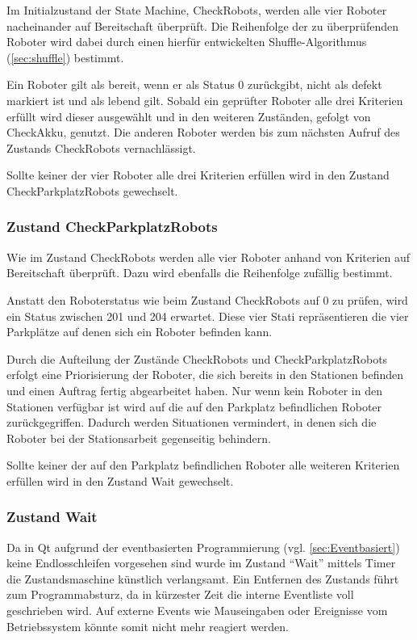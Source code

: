 Im Initialzustand der State Machine, CheckRobots, werden alle vier Roboter nacheinander auf Bereitschaft überprüft. Die Reihenfolge der zu überprüfenden Roboter wird dabei durch einen hierfür entwickelten Shuffle-Algorithmus (\ref{sec:shuffle}) bestimmt. 

Ein Roboter gilt als bereit, wenn er als Status 0 zurückgibt, nicht als defekt markiert ist und als lebend gilt. Sobald ein geprüfter Roboter alle drei Kriterien erfüllt wird dieser ausgewählt und in den weiteren Zuständen, gefolgt von CheckAkku, genutzt. Die anderen Roboter werden bis zum nächsten Aufruf des Zustands CheckRobots vernachlässigt.

Sollte keiner der vier Roboter alle drei Kriterien erfüllen wird in den Zustand CheckParkplatzRobots gewechselt.

\subsubsection{Zustand CheckParkplatzRobots}

Wie im Zustand CheckRobots werden alle vier Roboter anhand von Kriterien auf Bereitschaft überprüft. Dazu wird ebenfalls die Reihenfolge zufällig bestimmt.

Anstatt den Roboterstatus wie beim Zustand CheckRobots auf 0 zu prüfen, wird ein Status zwischen 201 und 204 erwartet. Diese vier Stati repräsentieren die vier Parkplätze auf denen sich ein Roboter befinden kann. 

Durch die Aufteilung der Zustände CheckRobots und CheckParkplatzRobots erfolgt eine Priorisierung der Roboter, die sich bereits in den Stationen befinden und einen Auftrag fertig abgearbeitet haben. Nur wenn kein Roboter in den Stationen verfügbar ist wird auf die auf den Parkplatz befindlichen Roboter zurückgegriffen. Dadurch werden Situationen vermindert, in denen sich die Roboter bei der Stationsarbeit gegenseitig behindern.

Sollte keiner der auf den Parkplatz befindlichen Roboter alle weiteren Kriterien erfüllen wird in den Zustand Wait gewechselt.

\subsubsection{Zustand Wait}

Da in Qt aufgrund der eventbasierten Programmierung (vgl. \ref{sec:Eventbasiert}) keine Endlosschleifen vorgesehen sind wurde im Zustand "`Wait"' mittels Timer die Zustandsmaschine künstlich verlangsamt. Ein Entfernen des Zustands führt zum Programmabsturz, da in kürzester Zeit die interne Eventliste voll geschrieben wird. Auf externe Events wie Mauseingaben oder Ereignisse vom Betriebssystem könnte somit nicht mehr reagiert werden. 


